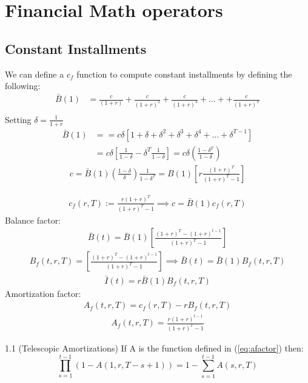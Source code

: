 \section{Financial Math operators}
\subsection{Constant Installments}
We can define a $c_f$ function to compute constant installments by defining the following:
\begin{align}
    \bar{B}(1) &= \frac{c}{(1+r)}+\frac{c}{(1+r)^2}+\frac{c}{(1+r)^3}+...++\frac{c}{(1+r)^T} \nonumber\\
\end{align}
Setting $\delta=\frac{1}{1+r}$
\begin{align}
    \bar{B}(1) &==c\delta[1+\delta+\delta^2+\delta^3+\delta^4+...+\delta^{T-1}] \nonumber \\
    &=c\delta\left[\frac{1}{1-\delta}-\delta^T\frac{1}{1-\delta}\right] =c\delta\left(\frac{1-\delta^T}{1-\delta}\right)
\end{align}
\begin{align}
    c=\bar{B}(1)\left(\frac{1-\delta}{\delta}\right)\frac{1}{1-\delta^T}=B(1)\left[r\frac{(1+r)^T}{(1+r)^T-1}\right]
\end{align}

\begin{align}
    \boxed{c_f(r,T):=\frac{r(1+r)^T}{(1+r)^T-1}} \implies c=\bar{B}(1)c_f(r,T)
\end{align}
Balance factor:
\begin{align}
    \bar{B}(t)=\bar{B}(1)\left[ \frac{(1+r)^T-(1+r)^{t-1}}{(1+r)^T-1} \right]
\end{align}
\begin{align}
    \boxed{B_f(t,r,T)=\left[ \frac{(1+r)^T-(1+r)^{t-1}}{(1+r)^T-1} \right]} \implies \bar{B}(t)=\bar{B}(1)B_f(t,r,T)
\end{align}
\begin{align}
    \bar{I}(t) = r\bar{B}(1)B_f(t,r,T)
\end{align}
Amortization factor:
\begin{align}
    A_f(t,r,T) = c_f(r,T)-rB_f(t,r,T)
\end{align}
\begin{align}
    \boxed{A_f(t,r,T)=\frac{r(1+r)^{t-1}}{(1+r)^T-1}} \label{eq:afactor}
\end{align}


\begin{theorem}{1.1 (Telescopic Amortizations)}{} \label{teo:1}
If A is the function defined in (\ref{eq:afactor}) then:
\[
\prod^{t-1}_{s=1}(1-A(1,r,T-s+1))=1-\sum^{t-1}_{s=1}A(s,r,T)
\]
\end{theorem}

